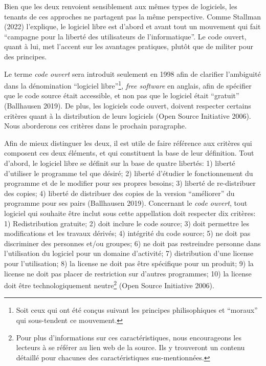\documentclass[
  letterpaper,
]{scrbook}
\begin{document}
Bien que les deux renvoient sensiblement aux mêmes types de logiciels,
les tenants de ces approches ne partagent pas la même perspective. Comme
Stallman (2022) l'explique, le logiciel libre est d'abord et avant tout
un mouvement qui fait ``campagne pour la liberté des utilisateurs de
l'informatique''. Le code ouvert, quant à lui, met l'accent sur les
avantages pratiques, plutôt que de militer pour des principes.

Le terme \emph{code ouvert} sera introduit seulement en 1998 afin de
clarifier l'ambiguité dans la dénomination ``logiciel
libre''\footnote{Soit ceux qui ont été conçus suivant les principes
  philisophiques et ``moraux'' qui sous-tendent ce mouvement.},
\emph{free software} en anglais, afin de spécifier que le code source
était accessible, et non pas que le logiciel était ``gratuit''
(Ballhausen 2019). De plus, les logiciels code ouvert, doivent respecter
certains critères quant à la distribution de leurs logiciels (Open
Source Initiative 2006). Nous aborderons ces critères dans le prochain
paragraphe.

Afin de mieux distinguer les deux, il est utile de faire référence aux
critères qui composent ces deux éléments, et qui constituent la base de
leur définition. Tout d'abord, le logiciel libre se définit sur la base
de quatre libertés: 1) liberté d'utiliser le programme tel que désiré;
2) liberté d'étudier le fonctionnement du programme et de le modifier
pour ses propres besoins; 3) liberté de re-distribuer des copies; 4)
liberté de distribuer des copies de la version ``améliorer'' du
programme pour ses pairs (Ballhausen 2019). Concernant le \emph{code
ouvert}, tout logiciel qui souhaite être inclut sous cette appellation
doit respecter dix critères: 1) Redistribution gratuite; 2) doit inclure
le code source; 3) doit permettre les modifications et les travaux
dérivés; 4) intégrité du code source; 5) ne doit pas discriminer des
personnes et/ou groupes; 6) ne doit pas restreindre personne dans
l'utilisation du logiciel pour un domaine d'activité; 7) distribution
d'une license pour l'utilisation; 8) la license ne doit pas être
spécifique pour un produit; 9) la license ne doit pas placer de
restriction sur d'autres programmes; 10) la license doit être
technologiquement neutre\footnote{Pour plus d'informations sur ces
  caractéristiques, nous encourageons les lecteurs à se référer au lien
  web de la source. Ils y trouveront un contenu détaillé pour chacunes
  des caractéristiques sus-mentionnées.} (Open Source Initiative 2006).
\end{document}

